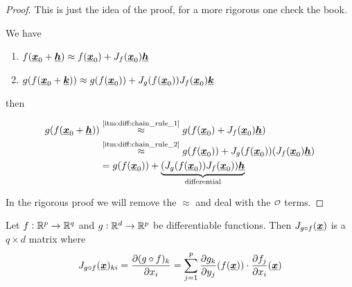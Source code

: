 \documentclass[12pt]{extarticle}
\renewcommand{\vec}[1]{\uvec{#1}}
\begin{document}
\begin{proof}
    This is just the idea of the proof, for a more rigorous one check the book.

    We have
    \begin{enumerate}[label=(\roman*.)]
        \item \label{itm:diff:chain_rule_1} $f(\vec{x}_0 + \vec{h}) \approx f(\vec{x}_0) + J_f(\vec{x}_0) \vec{h}$
        \item \label{itm:diff:chain_rule_2} $g(f(\vec{x}_0 + \vec{k})) \approx g(f(\vec{x}_0)) + J_g(f(\vec{x}_0)) J_f(\vec{x}_0) \vec{k}$
    \end{enumerate}

    then

    \begin{align}
        g(f(\vec{x}_0 + \vec{h})) & \stackrel{\text{\ref{itm:diff:chain_rule_1}}}{\approx} g(f(\vec{x}_0) + J_f(\vec{x}_0) \vec{h})                     \\
                                  & \stackrel{\text{\ref{itm:diff:chain_rule_2}}}{\approx} g(f(\vec{x}_0)) + J_g(f(\vec{x}_0)) (J_f(\vec{x}_0) \vec{h}) \\
                                  & = g(f(\vec{x}_0)) + \underbrace{(J_g(f(\vec{x}_0)) J_f(\vec{x}_0)) \vec{h}}_{\text{differential}}
    \end{align}

    In the rigorous proof we will remove the $\approx$ and deal with the $\o$ terms.
\end{proof}

\begin{example}
    Let $f: \mathbb{R}^p \to \mathbb{R}^q$ and $g: \mathbb{R}^d \to \mathbb{R}^p$ be differentiable functions.
    Then $J_{g \circ f}(\vec{x})$ is a $q \times d$ matrix where
    \begin{equation}
        J_{g \circ f}(\vec{x})_{ki} =
        \pdv{(g \circ f)_k}{x_i}() = \sum_{j=1}^p \pdv{g_k}{y_j}()(f(\vec{x})) \cdot \pdv{f_j}{x_i}()(\vec{x})
    \end{equation}
\end{example}
\end{document}
